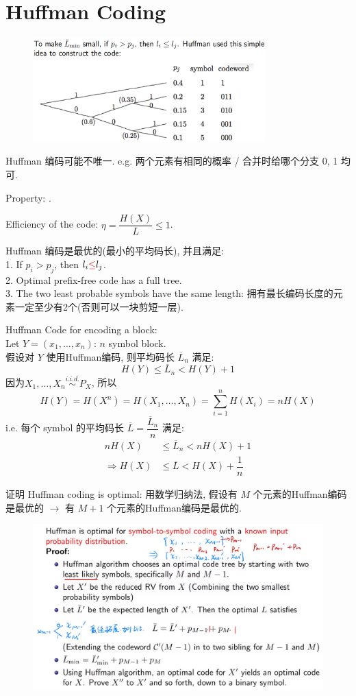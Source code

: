 \section{Huffman Coding}


\begin{figure}[htbp]
    \centering
    \includegraphics[width=0.8\textwidth]{./figures/chapter3/Huffman.png}
\end{figure}

Huffman 编码可能不唯一. e.g. 两个元素有相同的概率 / 合并时给哪个分支 0, 1 均可.

Property: .

Efficiency of the code: $\eta = \dfrac{H(X)}{L}\leq 1$.

\begin{proposition}
Huffman 编码是最优的(最小的平均码长), 并且满足: \\
1. If $p_i>p_j$, then $l_i\textcolor{red}{\leq} l_j$. \\
2. Optimal prefix-free code has a full tree. \\
3. The two least probable symbols have the same length: 拥有最长编码长度的元素一定至少有2个(否则可以一块剪短一层).
\end{proposition}

Huffman Code for encoding a block: \\
Let $Y=\left(x_1,\ldots,x_n\right)$: $n$ symbol block. \\
假设对 $Y$ 使用Huffman编码, 则平均码长 $\overline{L}_n$ 满足:
$$H(Y)\leq \overline{L}_n < H(Y)+1$$
因为$X_1,\ldots,X_n\stackrel{i.i.d.}{\sim}P_X$, 所以
$$H(Y)=H(X^n)=H(X_1,\ldots,X_n)=\sum_{i=1}^nH(X_i)=nH(X)$$
i.e. 每个 symbol 的平均码长 $\overline{L}=\dfrac{\overline{L}_n}{n}$ 满足:
\begin{align*}
nH(X) &\leq \overline{L}_n < nH(X)+1 \\
\Rightarrow H(X) &\leq \overline{L} < H(X)+\dfrac{1}{n}
\end{align*}


证明 Huffman coding is optimal: 用数学归纳法, 假设有 $M$ 个元素的Huffman编码是最优的 $\to$ 有 $M+1$ 个元素的Huffman编码是最优的.
\begin{figure}[htbp]
    \centering
    \includegraphics[width=1.1\textwidth]{./figures/chapter3/Huffman_optimal.png}
\end{figure}